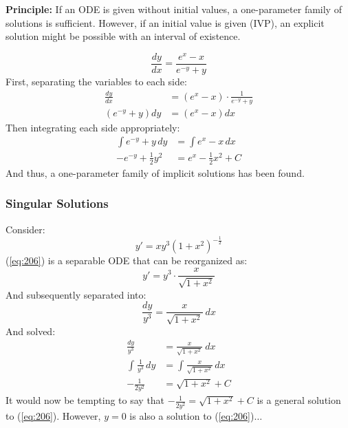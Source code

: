 \documentclass[12pt]{article}
\begin{document}
\textbf{Principle:} If an ODE is given without initial values, a one-parameter family of solutions is sufficient. However, if an initial value is given (IVP), an explicit solution might be possible with an interval of existence.

\begin{example}
  \begin{equation*}
    \frac{dy}{dx} = \frac{e^x - x}{e^{-y} + y}
  \end{equation*}
  First, separating the variables to each side:
  \begin{align*}
    \frac{dy}{dx} &= \left(e^x - x\right) \cdot \frac{1}{e^{-y} + y} \\
    \left(e^{-y} + y\right) dy &= \left(e^x - x\right) dx
  \end{align*}
  Then integrating each side appropriately:
  \begin{align*}
    \int e^{-y} + y \, dy &= \int e^x - x \, dx \\
    -e^{-y} + \frac{1}{2}y^2 &= e^x - \frac{1}{2}x^2 + C
  \end{align*}
  And thus, a one-parameter family of implicit solutions has been found.
\end{example}

\subsubsection{Singular Solutions}
\label{sssec:singularSolutions}

Consider:
\begin{equation}
  y' = xy^3\left(1+x^2\right)^{-\frac{1}{2}}
  \label{eq:206}
\end{equation}
(\ref{eq:206}) is a separable ODE that can be reorganized as:
\begin{equation*}
  y' = y^3 \cdot \frac{x}{\sqrt{1+x^2}}
\end{equation*}
And subsequently separated into:
\begin{equation*}
  \frac{dy}{y^3} = \frac{x}{\sqrt{1+x^2}}\ dx
\end{equation*}
And solved:
\begin{align*}
  \frac{dy}{y^3} &= \frac{x}{\sqrt{1+x^2}}\ dx \\
  \int_{}^{} \frac{1}{y^3} \, dy &= \int_{}^{} \frac{x}{\sqrt{1+x^2}}\,dx \\
  -\frac{1}{2y^2} &= \sqrt{1+x^2} + C
\end{align*}
It would now be tempting to say that $-\frac{1}{2y^2} = \sqrt{1+x^2} + C$ is a general solution to (\ref{eq:206}). However, $y=0$ is also a solution to (\ref{eq:206})$\hdots$
\end{document}
